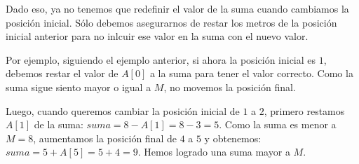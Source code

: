 \documentclass{oci}
\begin{document}
\begin{scoreDescription}
  Dado eso, ya no tenemos que redefinir el valor de la suma cuando cambiamos
  la posici\'on inicial. S\'olo debemos asegurarnos de restar los metros
  de la posici\'on inicial anterior para no inlcuir ese valor en la suma con el nuevo
  valor.

  Por ejemplo, siguiendo el ejemplo anterior, si ahora la posici\'on inicial es 
  $1$, debemos restar el valor de $A[0]$ a la suma para tener el valor correcto.
  Como la suma sigue siento mayor o igual a $M$, no movemos la posici\'on final.

  Luego, cuando queremos cambiar la posici\'on inicial de $1$ a $2$, primero restamos
  $A[1]$ de la suma: $suma = 8 - A[1] = 8 - 3 = 5$. Como la suma es menor a $M=8$, aumentamos 
  la posici\'on final de $4$ a $5$ y obtenemos: $suma = 5 + A[5] = 5 + 4 = 9$. Hemos
  logrado una suma mayor a $M$.

\end{scoreDescription}
\end{document}

